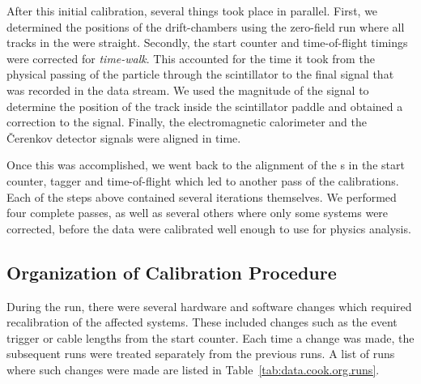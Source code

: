 After this initial calibration, several things took place in parallel. First, we determined the positions of the drift-chambers using the zero-field run where all tracks in the  were straight. Secondly, the start counter and time-of-flight timings were corrected for \emph{time-walk}. This accounted for the time it took from the physical passing of the particle through the scintillator to the final  signal that was recorded in the data stream. We used the magnitude of the  signal to determine the position of the track inside the scintillator paddle and obtained a correction to the  signal. Finally, the electromagnetic calorimeter and the \v{C}erenkov detector signals were aligned in time.

Once this was accomplished, we went back to the alignment of the s in the start counter, tagger and time-of-flight which led to another pass of the calibrations. Each of the steps above contained several iterations themselves. We performed four complete passes, as well as several others where only some systems were corrected, before the data were calibrated well enough to use for physics analysis.

\subsection{\label{sec:data.calib.org}Organization of Calibration Procedure}

During the  run, there were several hardware and software changes which required recalibration of the affected systems. These included changes such as the event trigger or cable lengths from the start counter. Each time a change was made, the subsequent runs were treated separately from the previous runs. A list of runs where such changes were made are listed in Table~\ref{tab:data.cook.org.runs}.



